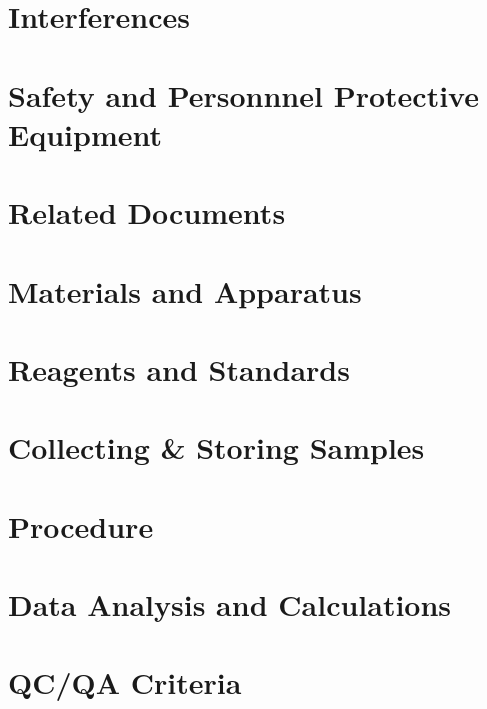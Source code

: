\documentclass{article}
\begin{document}
\section{Interferences}
\section{Safety and Personnnel Protective Equipment}
\section{Related Documents}
\section{Materials and Apparatus}
\section{Reagents and Standards}
\section{Collecting \& Storing Samples}
\section{Procedure}
\section{Data Analysis and Calculations}
\section{QC/QA Criteria}
\end{document}
